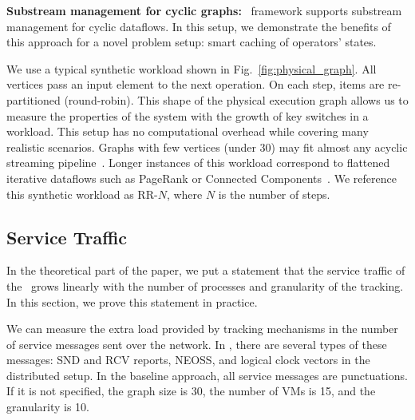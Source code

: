     \noindent \textbf{Substream management for cyclic graphs:} \tracker\ framework supports substream management for cyclic dataflows. In this setup, we demonstrate the benefits of this approach for a novel problem setup: smart caching of operators' states.


We use a typical synthetic workload shown in Fig.~\ref{fig:physical_graph}. All vertices pass an input element to the next operation. On each step, items are re-partitioned (round-robin). This shape of the physical execution graph allows us to measure the properties of the system with the growth of key switches in a workload. This setup has no computational overhead while covering many realistic scenarios. Graphs with few vertices (under 30) may fit almost any acyclic streaming pipeline~\cite{akidau2018streaming}. Longer instances of this workload correspond to flattened iterative dataflows such as PageRank or Connected Components~\cite{Murray:2013:NTD:2517349.2522738, xu2016efficient}. We reference this synthetic workload as RR-$N$, where $N$ is the number of steps.

\subsection{Service Traffic}
\label{exp_network_traffic}
In the theoretical part of the paper, we put a statement that the service traffic of the \tracker\ grows linearly with the number of processes and granularity of the tracking. In this section, we prove this statement in practice. 

We can measure the extra load provided by tracking mechanisms in the number of service messages sent over the network. In \tracker, there are several types of these messages: SND and RCV reports, NEOSS, and logical clock vectors in the distributed setup. In the baseline approach, all service messages are punctuations. If it is not specified, the graph size is 30, the number of VMs is 15, and the granularity is 10.

